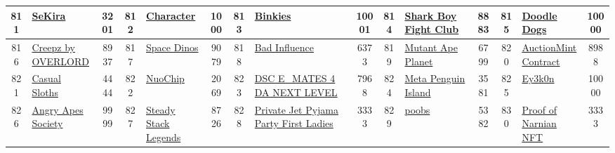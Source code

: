 \begin{table*}[]
{\begin{tabular}{|c|l|c|c|l|c|c|l|c|c|l|c|c|l|c|}
        811   & \href{https://opensea.io/collection/official-sekira}{SeKira}                       & 3201              & 812   & \href{https://castaways.com}{Character}                                                           & 1000              & 813   & \href{http://www.binkies.io}{Binkies}                                             & 10001             & 814   & \href{https://sharkboyfightclub.com}{Shark Boy Fight Club}                    & 8883              & 815   & \href{https://doodledogsnft.com}{Doodle Dogs}                                             & 10000                                   \\ \hline
        816   & \href{http://www.overlord.xyz}{Creepz by OVERLORD}                                 & 8937              & 817   & \href{https://spacepunks.club}{Space Dinos}                                                       & 9079              & 818   & \href{https://www.badinfluence.com/}{Bad Influence}                               & 6373              & 819   & \href{https://opensea.io/collection/mutant-ape-planet}{Mutant Ape Planet}     & 6799              & 820   & \href{https://mutantworld.com/}{AuctionMintContract}                                      & 8988                                    \\ \hline
        821   & \href{http://casualsloths.xyz}{Casual Sloths}                                      & 4444              & 822   & \href{https://www.nuo2069.io}{NuoChip}                                                            & 2069              & 823   & \href{https://opensea.io/collection/nomoreofficial}{DSC E\_MATES 4 DA NEXT LEVEL} & 7968              & 824   & \href{https://opensea.io/collection/meta-penguin-island}{Meta Penguin Island} & 3581              & 825   & \href{https://ey3k0n.io}{Ey3k0n}                                                          & 10000                                   \\ \hline
        826   & \href{https://angryapessociety.com/}{Angry Apes Society}                           & 9999              & 827   & \href{https://steadystacknft.com/}{Steady Stack Legends}                                          & 8726              & 828   & \href{http://www.pjpp.club}{Private Jet Pyjama Party First Ladies}                & 3333              & 829   & \href{https://poobnft.com/}{poobs}                                            & 5382              & 830   & \href{https://narnia.capital/}{Proof of Narnian NFT}                                      & 3333                                    \\ \hline

\end{tabular}}
\end{table*}
